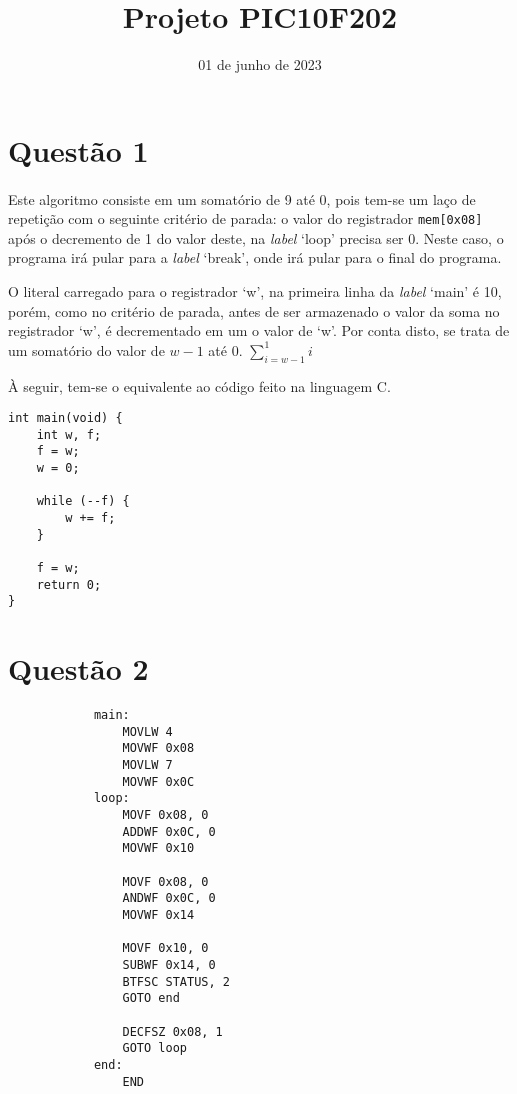 \documentclass[12pt]{article}
\title{Projeto PIC10F202}
\author{\sc{Pedro Faria Fernandes, Vinícios Bidin \& Yuri Becker}}
\date{01 de junho de 2023}
\begin{document}
	\maketitle

	\section{Questão 1}
		\paragraph{} Este algoritmo consiste em um somatório de 9 até 0, pois tem-se um laço de repetição com o seguinte critério de parada: o valor do registrador \texttt{mem[0x08]}
		após o decremento de 1 do valor deste, na \textit{label} `loop' precisa ser 0. Neste caso, o programa irá pular para a \textit{label} `break', onde irá pular para o final do programa.
		\par{} O literal carregado para o registrador `w', na primeira linha da \textit{label} `main' é 10, porém, como no critério de parada, antes de ser armazenado o valor da soma no registrador `w', é decrementado em um o valor de `w'. Por conta disto, se trata de um somatório do valor de $w - 1$ até 0. $\sum\limits_{i=w-1}^{1}i$
		\par{} À seguir, tem-se o equivalente ao código feito na linguagem C.
		\begin{verbatim}
int main(void) {
	int w, f;
	f = w;
	w = 0;

	while (--f) {
		w += f;
	}

	f = w;
	return 0;
}
		\end{verbatim}
	\section{Questão 2}
		\begin{verbatim}
			main:
			    MOVLW 4
			    MOVWF 0x08
			    MOVLW 7
			    MOVWF 0x0C
			loop:
			    MOVF 0x08, 0
			    ADDWF 0x0C, 0
			    MOVWF 0x10

			    MOVF 0x08, 0
			    ANDWF 0x0C, 0
			    MOVWF 0x14

			    MOVF 0x10, 0
			    SUBWF 0x14, 0
			    BTFSC STATUS, 2
			    GOTO end

			    DECFSZ 0x08, 1
			    GOTO loop
			end:
			    END
		\end{verbatim}
\end{document}
